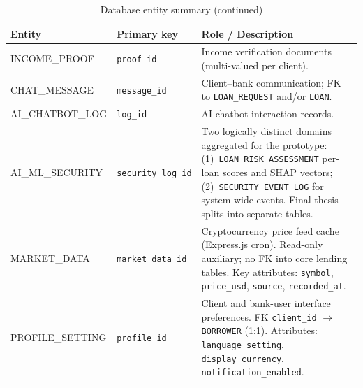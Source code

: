 \documentclass[12pt, a4paper]{report}
\newcommand{\tableheadcolor}{\rowcolor{TableHeadBg}}
\begin{document}
\newpage
\begin{table}[H]
\centering
\caption[Database entity summary (continued)]{Database entity summary (continued)}
\small
\begin{tabular}{@{}p{2.6cm}p{3.4cm}p{7.0cm}@{}}
\toprule
\tableheadcolor
\textbf{Entity} & \textbf{Primary key} & \textbf{Role / Description} \\
\midrule
INCOME\_PROOF & \texttt{proof\_id} & Income verification documents (multi-valued per client). \\
CHAT\_MESSAGE & \texttt{message\_id} & Client--bank communication; FK to \texttt{LOAN\_REQUEST} and/or \texttt{LOAN}. \\
AI\_CHATBOT\_LOG & \texttt{log\_id} & AI chatbot interaction records. \\
AI\_ML\_SECURITY & \texttt{security\_log\_id} & Two logically distinct domains aggregated for the prototype: (1)~\texttt{LOAN\_RISK\_ASSESSMENT} per-loan scores and SHAP vectors; (2)~\texttt{SECURITY\_EVENT\_LOG} for system-wide events. Final thesis splits into separate tables. \\
MARKET\_DATA & \texttt{market\_data\_id} & Cryptocurrency price feed cache (Express.js cron). Read-only auxiliary; no FK into core lending tables. Key attributes: \texttt{symbol}, \texttt{price\_usd}, \texttt{source}, \texttt{recorded\_at}. \\
PROFILE\_SETTING & \texttt{profile\_id} & Client and bank-user interface preferences. FK \texttt{client\_id} $\to$ \texttt{BORROWER} (1:1). Attributes: \texttt{language\_setting}, \texttt{display\_currency}, \texttt{notification\_enabled}. \\
\bottomrule
\end{tabular}
\end{table}
\end{document}
